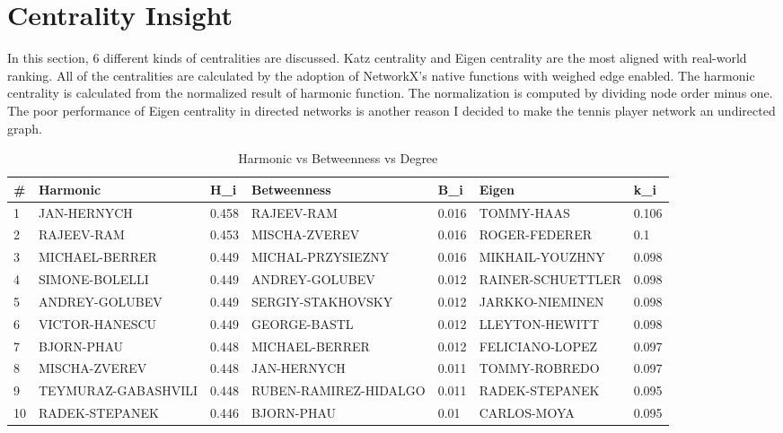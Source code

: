 \documentclass[runningheads]{llncs}
\begin{document}
 
\section{Centrality Insight}

In this section, 6 different kinds of centralities are discussed. Katz centrality and Eigen centrality are the most aligned with real-world ranking. All of the centralities are calculated by the adoption of NetworkX's native functions with weighed edge enabled. The harmonic centrality is calculated from the normalized result of harmonic function. The normalization is computed by dividing node order minus one. The poor performance of Eigen centrality in directed networks is another reason I decided to make the tennis player network an undirected graph.

\begin{table}
\caption{Harmonic vs Betweenness vs Degree}\label{tab_total_compare}
\begin{tabular}{|l|l|l|l|l|l|l|} \hline
\# & Harmonic & H_{i} & Betweenness & B_{i} & Eigen & k_{i} \\ \hline
1 & JAN-HERNYCH & 0.458 & RAJEEV-RAM & 0.016 & TOMMY-HAAS & 0.106 \\ \hline
2 & RAJEEV-RAM & 0.453 & MISCHA-ZVEREV & 0.016 & ROGER-FEDERER & 0.1 \\ \hline
3 & MICHAEL-BERRER & 0.449 & MICHAL-PRZYSIEZNY & 0.016 & MIKHAIL-YOUZHNY & 0.098 \\ \hline
4 & SIMONE-BOLELLI & 0.449 & ANDREY-GOLUBEV & 0.012 & RAINER-SCHUETTLER & 0.098 \\ \hline
5 & ANDREY-GOLUBEV & 0.449 & SERGIY-STAKHOVSKY & 0.012 & JARKKO-NIEMINEN & 0.098 \\ \hline
6 & VICTOR-HANESCU & 0.449 & GEORGE-BASTL & 0.012 & LLEYTON-HEWITT & 0.098 \\ \hline
7 & BJORN-PHAU & 0.448 & MICHAEL-BERRER & 0.012 & FELICIANO-LOPEZ & 0.097 \\ \hline
8 & MISCHA-ZVEREV & 0.448 & JAN-HERNYCH & 0.011 & TOMMY-ROBREDO & 0.097 \\ \hline
9 & TEYMURAZ-GABASHVILI & 0.448 & RUBEN-RAMIREZ-HIDALGO & 0.011 & RADEK-STEPANEK & 0.095 \\ \hline
10 & RADEK-STEPANEK & 0.446 & BJORN-PHAU & 0.01 & CARLOS-MOYA & 0.095 \\ \hline

\end{tabular}
\end{table}
\end{document}
